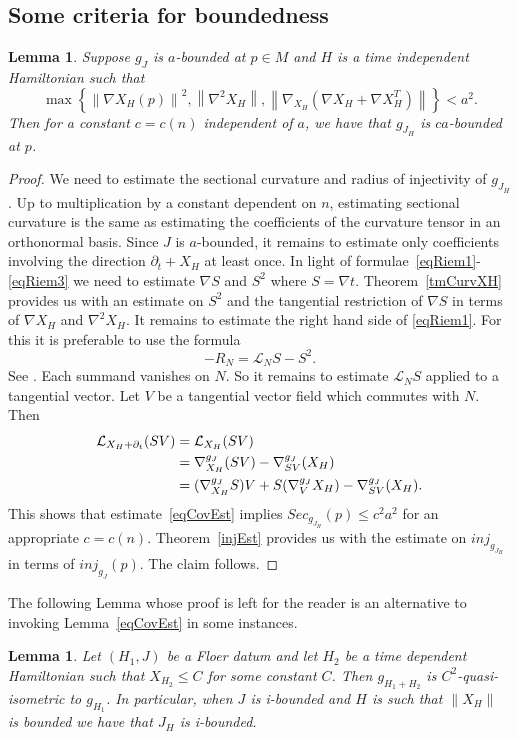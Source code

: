 \documentclass[11pt]{amsart}
\newtheorem{lm}[tm]{Lemma}
\theoremstyle{definition}
\theoremstyle{remark}
\begin{document}
\subsection{Some criteria for boundedness}
\begin{lm}
Suppose $g_J$ is $a$-bounded at $p\in M$ and $H$ is a time independent Hamiltonian such that
\begin{equation}\label{eqCovEst}
\max\left\{\left\|\nabla X_H(p)\right\|^2,\left\|\nabla^2X_H\right\|,\left\|\nabla_{X_H}\left(\nabla X_H+\nabla X_H^T\right)\right\|\right\}<a^2.
\end{equation}
Then for a constant $c=c(n)$ independent of $a$, we have that $g_{J_H}$ is $ca$-bounded at $p$.
\end{lm}
\begin{proof}
We need to estimate the sectional curvature and radius of injectivity of $g_{J_H}$. Up to multiplication by a constant dependent on $n$, estimating sectional curvature is the same as estimating the coefficients of the curvature tensor in an orthonormal basis. Since $J$ is $a$-bounded, it remains to estimate only coefficients involving the direction $\partial_t+X_H$ at least once. In light of formulae~\eqref{eqRiem1}-\eqref{eqRiem3} we need to estimate $\nabla S$ and $S^2$ where $S=\nabla t$. Theorem~\ref{tmCurvXH} provides us with an estimate on $S^2$ and the tangential restriction of $\nabla S$ in terms of $\nabla X_H$ and $\nabla^2 X_H$. It remains to estimate the right hand side of \eqref{eqRiem1}. For this it is preferable to use the formula
\[
-R_{N}=\mathcal{L}_{ N}S-S^2.
\]
See \cite{pe}. Each summand vanishes on $N$. So it remains to estimate $\mathcal{L}_{ N}S$ applied to a tangential vector. Let $V$ be a tangential vector field which commutes with $N.$ Then
\begin{align}
\mathcal{L}_{X_H+\partial_t}(SV)&=\mathcal{L}_{X_H}(SV)\notag\\
&=\nabla^{g_J}_{X_H}({S}V)-\nabla^{g_J}_{SV}(X_H)\notag\\
&=(\nabla^{g_J}_{X_H}{S})V+S(\nabla^{g_J}_V{X_H})-\nabla^{g_J}_{SV}(X_H)\notag.
\end{align}
This shows that estimate~\eqref{eqCovEst} implies $Sec_{g_{J_H}}(p)\leq c^2a^2$ for an appropriate $c=c(n)$. Theorem~\ref{injEst} provides us with the estimate on $inj_{g_{J_H}}$ in terms of $inj_{g_J}(p)$. The claim follows.
\end{proof}

The following Lemma whose proof is left for the reader is an alternative to invoking Lemma~\ref{eqCovEst} in some instances.
\begin{lm}\label{lmQuasHam}
Let $(H_1,J)$ be a Floer datum and let $H_2$ be a time dependent Hamiltonian such that $X_{H_2}\leq C$ for some constant $C$. Then $g_{H_1+H_2}$ is $C^2$-quasi-isometric to $g_{H_1}$. In particular, when $J$ is i-bounded and $H$ is such that $\|X_H\|$ is bounded we have that $J_{H}$ is i-bounded.
\end{lm}
\end{document}
